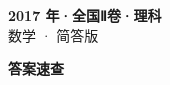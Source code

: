 \documentclass[zihao=-4, a4paper]{ctexart}
\begin{document}
\begin{center}
  {\Large\bfseries 2017 年·全国Ⅱ卷·理科}\\[4pt]
  {\large 数学 · 简答版}
\end{center}
\medskip
{}

\clearpage
{}
\begin{center}{\Large\bfseries 答案速查}\end{center}
\medskip

\end{document}

